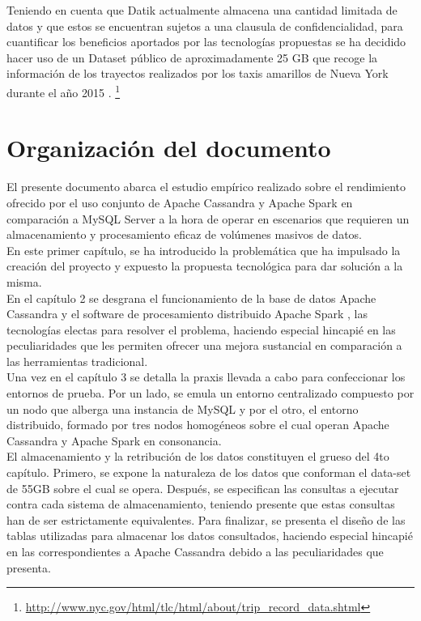 Teniendo en cuenta que Datik actualmente almacena una cantidad limitada de datos y que estos se encuentran sujetos a una clausula de confidencialidad, para cuantificar los beneficios aportados por las tecnologías propuestas se ha decidido hacer uso de un Dataset público de aproximadamente 25 GB que recoge la información de los trayectos realizados por los taxis amarillos de Nueva York durante el año 2015 . \footnote{\url{http://www.nyc.gov/html/tlc/html/about/trip_record_data.shtml}}\\

\section{Organización del documento}

El presente documento abarca el estudio empírico realizado sobre el rendimiento ofrecido por el uso conjunto de Apache Cassandra y Apache Spark en comparación a MySQL Server a la hora de operar en escenarios que requieren un almacenamiento y procesamiento eficaz de volúmenes masivos de datos.\\

En este primer capítulo, se ha introducido la problemática que ha impulsado la creación del proyecto y expuesto la propuesta tecnológica para dar solución a la misma.\\

En el capítulo 2 se desgrana el funcionamiento de la base de datos Apache Cassandra \cite{lakshman2010cassandra} y el software de procesamiento distribuido Apache Spark \cite{zaharia2010spark}, las tecnologías electas para resolver el problema, haciendo especial hincapié en las peculiaridades que les permiten ofrecer una mejora sustancial en comparación a las herramientas tradicional.\\

Una vez en el capítulo 3 se detalla la praxis llevada a cabo para confeccionar los entornos de prueba. Por un lado, se emula un entorno centralizado compuesto por un nodo que alberga una instancia de MySQL y por el otro, el entorno distribuido, formado por tres nodos homogéneos sobre el cual operan Apache Cassandra y Apache Spark en consonancia.\\ 

El almacenamiento y la retribución de los datos constituyen el grueso del 4to capítulo. Primero, se expone la naturaleza de los datos que conforman el data-set de 55GB sobre el cual se opera. Después, se especifican las consultas a ejecutar contra cada sistema de almacenamiento, teniendo presente que estas consultas han de ser estrictamente equivalentes. Para finalizar, se presenta el diseño de las tablas utilizadas para almacenar los datos consultados, haciendo especial hincapié en las correspondientes a Apache Cassandra debido a las peculiaridades que presenta.\\ 

